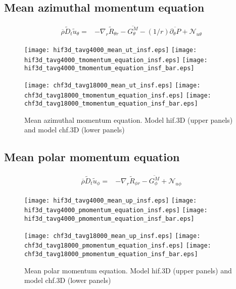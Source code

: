 \documentclass[10pt,paper=a4]{report}
\newcommand{\fav}{\widetilde}
\newcommand{\av}{\overline}
\begin{document}
\newpage

\subsection{Mean azimuthal momentum equation}

\begin{align}
\av{\rho}\fav{D}_t\fav{u}_\theta = & -\nabla_r \fav{R}_{\theta r} -\av{G^{M}_\theta} - (1/r)\overline{\partial_\theta P} + {\mathcal N_{u \theta}} 
\end{align}

\begin{figure}[!h]
\centerline{
\texttt{[image: hif3d\_tavg4000\_mean\_ut\_insf.eps]}
\texttt{[image: hif3d\_tavg4000\_tmomentum\_equation\_insf.eps]}
\texttt{[image: hif3d\_tavg4000\_tmomentum\_equation\_insf\_bar.eps]}}

\centerline{
\texttt{[image: chf3d\_tavg18000\_mean\_ut\_insf.eps]}
\texttt{[image: chf3d\_tavg18000\_tmomentum\_equation\_insf.eps]}
\texttt{[image: chf3d\_tavg18000\_tmomentum\_equation\_insf\_bar.eps]}}

\caption{Mean azimuthal momentum equation. Model {\sf hif.3D} (upper panels) and model {\sf chf.3D} (lower panels)}
\end{figure}

\newpage

\subsection{Mean polar momentum equation}

\begin{align}
\av{\rho}\fav{D}_t\fav{u}_\phi = & -\nabla_r \fav{R}_{\phi r} -\av{G^{M}_\phi} + {\mathcal N_{u \phi}}
\end{align}

\begin{figure}[!h]
\centerline{
\texttt{[image: hif3d\_tavg4000\_mean\_up\_insf.eps]}
\texttt{[image: hif3d\_tavg4000\_pmomentum\_equation\_insf.eps]}
\texttt{[image: hif3d\_tavg4000\_pmomentum\_equation\_insf\_bar.eps]}}

\centerline{
\texttt{[image: chf3d\_tavg18000\_mean\_up\_insf.eps]}
\texttt{[image: chf3d\_tavg18000\_pmomentum\_equation\_insf.eps]}
\texttt{[image: chf3d\_tavg18000\_pmomentum\_equation\_insf\_bar.eps]}}

\caption{Mean polar momentum equation. Model {\sf hif.3D} (upper panels) and model {\sf chf.3D} (lower panels)}
\end{figure}
\end{document}
